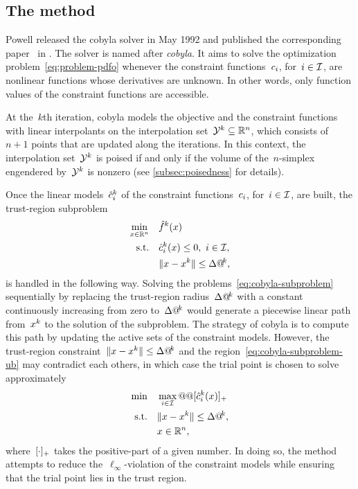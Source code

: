 \subsection{The  method}
\label{subsec:cobyla}

Powell released the \gls{cobyla} solver in May 1992 and published the corresponding paper~\cite{Powell_1994} in .
The solver is named after \emph{\glsdesc{cobyla}}.
It aims to solve the optimization problem~\cref{eq:problem-pdfo} whenever the constraint functions~$c_{i}$, for~$i \in \mathcal{I}$, are nonlinear functions whose derivatives are unknown.
In other words, only function values of the constraint functions are accessible.

At the~$k$th iteration, \gls{cobyla} models the objective and the constraint functions with linear interpolants on the interpolation set~$\xpt[k] \subseteq \R^n$, which consists of~$n + 1$ points that are updated along the iterations.
In this context, the interpolation set~$\xpt[k]$ is poised if and only if the volume of the~$n$-simplex engendered by~$\xpt[k]$ is nonzero (see \cref{subsec:poisedness} for details).

Once the linear models~$\conm[k]{i}$ of the constraint functions~$c_{i}$, for~$i \in \mathcal{I}$, are built, the trust-region subproblem
\begin{subequations}
    \label{eq:cobyla-subproblem}
    \begin{align}
        \min_{\iter \in \R^n}   & \quad \objm[k](\iter)\\
        \text{s.t.}             & \quad \conm[k]{i}(\iter) \le 0, ~ i \in \iub, \label{eq:cobyla-subproblem-ub}\\
                                & \quad \norm{\iter - \iter[k]} \le \rad[k],
    \end{align}
\end{subequations}
is handled in the following way.
Solving the problems~\cref{eq:cobyla-subproblem} sequentially by replacing the trust-region radius~$\rad[k]$ with a constant continuously increasing from zero to~$\rad[k]$ would generate a piecewise linear path from~$\iter[k]$ to the solution of the subproblem.
The strategy of \gls{cobyla} is to compute this path by updating the active sets of the constraint models.
However, the trust-region constraint~$\norm{\iter - \iter[k]} \le \rad[k]$ and the region~\cref{eq:cobyla-subproblem-ub} may contradict each others, in which case the trial point is chosen to solve approximately
\begin{align*}
    \min        & \quad \max_{i \in \iub} @@ \posp{\conm[k]{i}(\iter)}\\
    \text{s.t.} & \quad \norm{\iter - \iter[k]} \le \rad[k],\\
                & \quad \iter \in \R^n,
\end{align*}
%
where~$[\cdot]_+$ takes the positive-part of a given number.
In doing so, the method attempts to reduce the~$\ell_{\infty}$-violation of the constraint models while ensuring that the trial point lies in the trust region.

